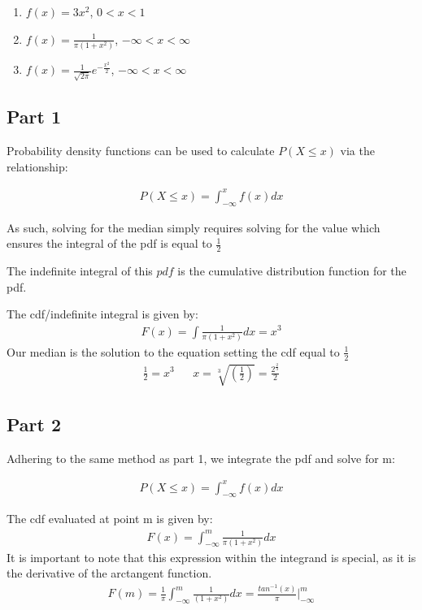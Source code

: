 \documentclass{article}
\begin{document}
\begin{enumerate}
\item
$f(x)=3x^2$, $0<x<1$
\item
$f(x)=\frac{1}{\pi (1+x^2)}$, $-\infty<x<\infty$
\item
$f(x)=\frac{1}{\sqrt{2\pi}}e^{-\frac{x^2}{2}}$, $-\infty<x<\infty$
\end{enumerate}


\subsection*{Part 1}
Probability density functions can be used to calculate $P(X\leq x)$ via the relationship:

\begin{align*}
P(X\leq x) = \int_{-\infty}^{x} f(x) dx
\end{align*}

As such, solving for the median simply requires solving for the value which ensures the integral of the pdf is equal to $\frac{1}{2}$

The indefinite integral of this $pdf$ is the cumulative distribution function for the pdf.

The cdf/indefinite integral is given by:
\begin{align*}
F(x) = \int \frac{1}{\pi (1+x^2)} dx = x^3
\end{align*}
Our median is the solution to the equation setting the cdf equal to $\frac{1}{2}$
\begin{align*}
\frac{1}{2} = x^3 && \boxed{x=\sqrt[3]{(\frac{1}{2})} = \frac{2^{\tfrac{2}{3}}}{2}}
\end{align*}

\subsection*{Part 2}
Adhering to the same method as part 1, we integrate the pdf and solve for m: 

\begin{align*}
P(X\leq x) = \int_{-\infty}^{x} f(x) dx
\end{align*}

The cdf evaluated at point m is given by:
\begin{align*}
F(x) = \int_{-\infty}^{m} \frac{1}{\pi (1+x^2)} dx
\end{align*}
It is important to note that this expression within the integrand is special, as it is the derivative of the arctangent function.
\begin{align*}
F(m) = \frac{1}{\pi} \int_{-\infty}^{m} \frac{1}{(1+x^2)} dx = \frac{tan^{-1}(x)}{\pi} |_{-\infty}^{m}
\end{align*}
\end{document}
